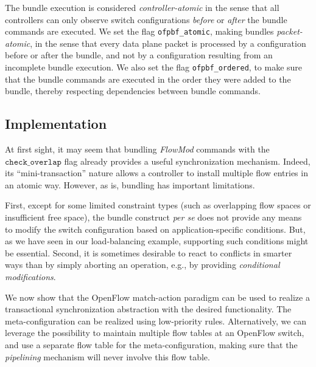 \documentclass[conference]{sigcomm-alternate}
\newcommand{\checko}{\texttt{check\_overlap}\xspace}
\begin{document}
The bundle execution is considered \emph{controller-atomic}
in the sense that all controllers can only observe switch
configurations \emph{before} or \emph{after} the
bundle commands are executed.
We set the flag \texttt{ofpbf\_atomic},
making bundles \emph{packet-atomic},
in the sense that every data plane packet is processed by a configuration
before or after the bundle, and not by a configuration resulting from
an incomplete bundle execution.
We also set the flag \texttt{ofpbf\_ordered},  to make sure that the
bundle commands are executed in the order they were added to the
bundle, thereby respecting dependencies between bundle commands.

\subsection{Implementation} 

At first sight, it may seem that bundling \emph{FlowMod} commands with  the $\checko$
flag already provides a useful synchronization mechanism.
Indeed, its ``mini-transaction'' nature allows a controller
to install multiple flow entries in an atomic way.
However, as is,
bundling has important limitations. %

First, %
except for some limited constraint types (such as
overlapping flow spaces or insufficient free space),
the bundle construct \emph{per se} 
does not provide any means to modify the switch configuration
based on application-specific conditions.
But, as we have seen in our load-balancing
example, supporting such conditions 
might be essential.
Second, it is sometimes desirable to react to conflicts in smarter ways than
by simply aborting an operation, e.g., by providing \emph{conditional modifications}.

We now show that the OpenFlow match-action paradigm 
can be used  to realize a transactional synchronization abstraction
with the desired functionality. 
The 
meta-configuration can be realized using low-priority rules.
Alternatively, we can leverage the possibility to maintain multiple
flow tables at an OpenFlow switch, and use a separate flow table for
the meta-configuration,  making sure that the
\emph{pipelining} mechanism will never involve this
flow table.
\end{document}
